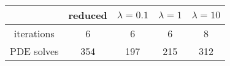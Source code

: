 \begin{tabular}{ccccc}
& reduced & $\lambda = 0.1$ & $\lambda = 1$ & $\lambda = 10$ \\
\hline
iterations & 6 & 6 & 6 & 8 \\
PDE solves & 354 & 197 & 215 & 312 \\
\hline
\end{tabular}
